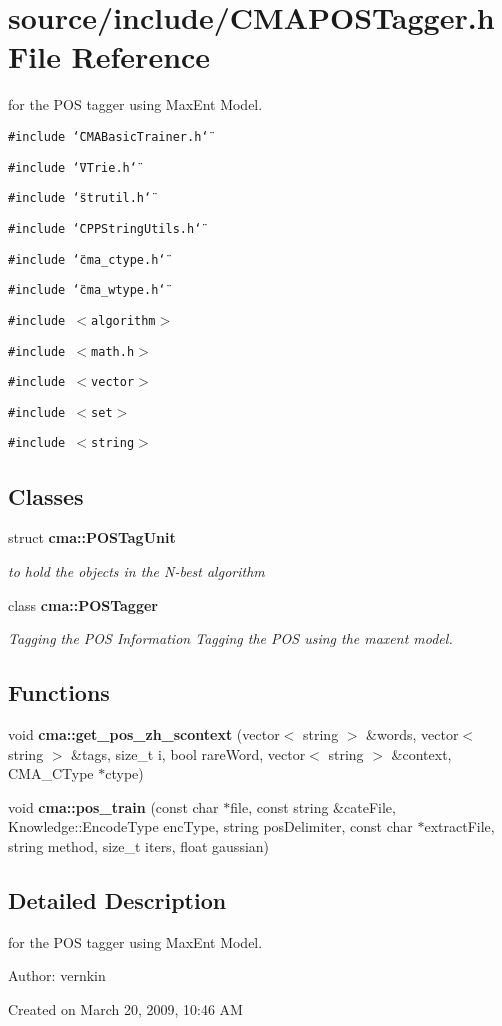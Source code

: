 \section{source/include/CMAPOSTagger.h File Reference}
\label{CMAPOSTagger_8h}
for the POS tagger using MaxEnt Model.  


{\tt \#include \char`\"{}CMABasicTrainer.h\char`\"{}}\par
{\tt \#include \char`\"{}VTrie.h\char`\"{}}\par
{\tt \#include \char`\"{}strutil.h\char`\"{}}\par
{\tt \#include \char`\"{}CPPStringUtils.h\char`\"{}}\par
{\tt \#include \char`\"{}cma\_\-ctype.h\char`\"{}}\par
{\tt \#include \char`\"{}cma\_\-wtype.h\char`\"{}}\par
{\tt \#include $<$algorithm$>$}\par
{\tt \#include $<$math.h$>$}\par
{\tt \#include $<$vector$>$}\par
{\tt \#include $<$set$>$}\par
{\tt \#include $<$string$>$}\par
\subsection*{Classes}
\begin{CompactItemize}
\item 
struct {\bf cma::POSTagUnit}
\begin{CompactList}\small\item\em to hold the objects in the N-best algorithm \item\end{CompactList}\item 
class {\bf cma::POSTagger}
\begin{CompactList}\small\item\em Tagging the POS Information Tagging the POS using the maxent model. \item\end{CompactList}\end{CompactItemize}
\subsection*{Functions}
\begin{CompactItemize}
\item 
void {\bf cma::get\_\-pos\_\-zh\_\-scontext} (vector$<$ string $>$ \&words, vector$<$ string $>$ \&tags, size\_\-t i, bool rareWord, vector$<$ string $>$ \&context, CMA\_\-CType $\ast$ctype)
\item 
void {\bf cma::pos\_\-train} (const char $\ast$file, const string \&cateFile, Knowledge::EncodeType encType, string posDelimiter, const char $\ast$extractFile, string method, size\_\-t iters, float gaussian)
\end{CompactItemize}


\subsection{Detailed Description}
for the POS tagger using MaxEnt Model. 

\begin{Desc}
\item[Author:]vernkin\end{Desc}
Created on March 20, 2009, 10:46 AM 